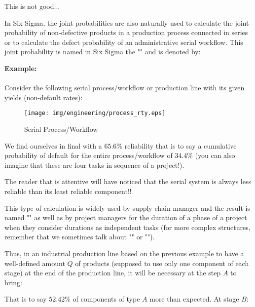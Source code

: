 	This is not good...

	In Six Sigma, the joint probabilities are also naturally used to calculate the joint probability of non-defective products in a production process connected in series or to calculate the defect probability of an administrative serial workflow. This joint probability is named in Six Sigma the "" and is denoted by:
	
	\pagebreak

	\begin{tcolorbox}[colframe=black,colback=white,sharp corners]
	\textbf{{\Large {}}Example:}\\\\
	Consider the following serial process/workflow or production line with its given yields (non-default rates):

	\begin{figure}[H]
		\centering
		\texttt{[image: img/engineering/process\_rty.eps]}
		\caption{Serial Process/Workflow}
	\end{figure}
	
	We find ourselves in final with a $65.6\%$ reliability that is to say a cumulative probability of default for the entire process/workflow of $34.4\%$ (you can also imagine that these are four tasks in sequence of a project!).
	\end{tcolorbox}
	\begin{tcolorbox}[title=Remark,colframe=black,arc=10pt]
The reader that is attentive will have noticed that the serial system is always less reliable than its least reliable component!!
	\end{tcolorbox}
	
This type of calculation is widely used by supply chain manager and the result is named "" as well as by project managers for the duration of a phase of a project when they consider durations as independent tasks (for more complex structures, remember that we sometimes talk about "" or "").

Thus, in an industrial production line based on the previous example to have a well-defined amount $Q$ of products (supposed to use only one component of each stage) at the end of the production line, it will be necessary at the step $A$ to bring:

	
That is to say $52.42\%$ of components of type $A$ more than expected. At stage $B$:
	

